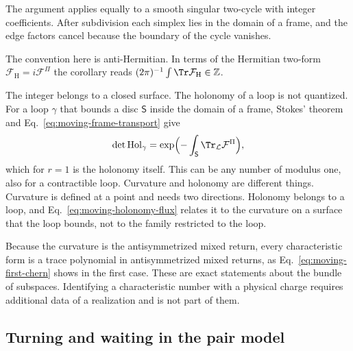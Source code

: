 The argument applies equally to a smooth singular two-cycle with integer coefficients. After subdivision each simplex lies in the domain of a frame, and the edge factors cancel because the boundary of the cycle vanishes.

The convention here is anti-Hermitian. In terms of the Hermitian two-form $\mathcal F_{\mathrm H}=i\mathcal F^\Pi$ the corollary reads $(2\pi)^{-1}\int\Tr\mathcal F_{\mathrm H}\in\mathbb Z$.

The integer belongs to a closed surface. The holonomy of a loop is not quantized. For a loop $\gamma$ that bounds a disc $\mathsf S$ inside the domain of a frame, Stokes' theorem and Eq.~\eqref{eq:moving-frame-transport} give
\begin{equation}
 \det\operatorname{Hol}_\gamma=\exp\Bigl(-\int_{\mathsf S}\Tr_{\mathcal L}\mathcal F^\Pi\Bigr),
 \label{eq:moving-holonomy-flux}
\end{equation}
which for $r=1$ is the holonomy itself. This can be any number of modulus one, also for a contractible loop. Curvature and holonomy are different things. Curvature is defined at a point and needs two directions. Holonomy belongs to a loop, and Eq.~\eqref{eq:moving-holonomy-flux} relates it to the curvature on a surface that the loop bounds, not to the family restricted to the loop.

Because the curvature is the antisymmetrized mixed return, every characteristic form is a trace polynomial in antisymmetrized mixed returns, as Eq.~\eqref{eq:moving-first-chern} shows in the first case. These are exact statements about the bundle of subspaces. Identifying a characteristic number with a physical charge requires additional data of a realization and is not part of them.

\subsection{Turning and waiting in the pair model}
\label{subsec:moving-pair}

